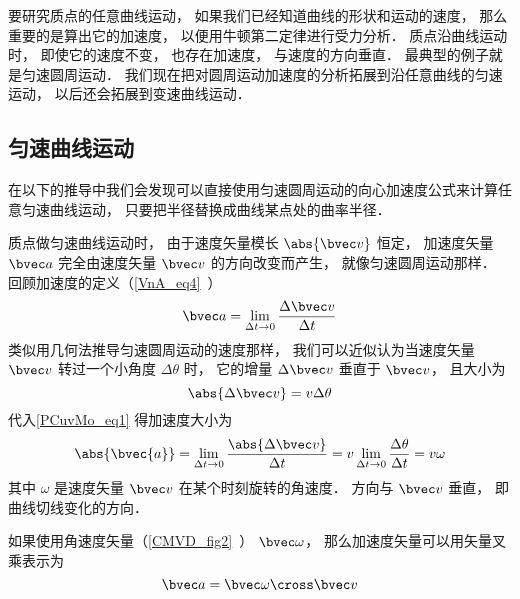 

要研究质点的任意曲线运动， 如果我们已经知道曲线的形状和运动的速度， 那么重要的是算出它的加速度， 以便用牛顿第二定律进行受力分析． 质点沿曲线运动时， 即使它的速度不变， 也存在加速度， 与速度的方向垂直． 最典型的例子就是匀速圆周运动． 我们现在把对圆周运动加速度的分析拓展到沿任意曲线的匀速运动， 以后还会拓展到变速曲线运动．

\subsection{匀速曲线运动}
在以下的推导中我们会发现可以直接使用匀速圆周运动的向心加速度公式来计算任意匀速曲线运动， 只要把半径替换成曲线某点处的曲率半径．

质点做匀速曲线运动时， 由于速度矢量模长 $\abs{\bvec v}$ 恒定， 加速度矢量 $\bvec a$ 完全由速度矢量 $\bvec v$ 的方向改变而产生， 就像匀速圆周运动那样． 回顾加速度的定义（\autoref{VnA_eq4}~）
\begin{equation}\label{PCuvMo_eq2}
\bvec a = \lim_{\Delta t \to 0} \frac{\Delta \bvec v}{\Delta t}
\end{equation}
类似用几何法推导匀速圆周运动的速度那样， 我们可以近似认为当速度矢量 $\bvec v$ 转过一个小角度 $\Delta \theta$ 时， 它的增量 $\Delta \bvec v$ 垂直于 $\bvec v$， 且大小为
\begin{equation}\label{PCuvMo_eq1}
\abs{\Delta \bvec v} = v\Delta\theta
\end{equation}
代入\autoref{PCuvMo_eq1} 得加速度大小为
\begin{equation}\label{PCuvMo_eq4}
\abs{\bvec{a}} = \lim_{\Delta t \to 0} \frac{\abs{\Delta \bvec v}}{\Delta t}
= v\lim_{\Delta t \to 0}\frac{\Delta \theta}{\Delta t} = v\omega
\end{equation}
其中 $\omega$ 是速度矢量 $\bvec v$ 在某个时刻旋转的角速度． 方向与 $\bvec v$ 垂直， 即曲线切线变化的方向．

如果使用角速度矢量（\autoref{CMVD_fig2}~） $\bvec \omega$， 那么加速度矢量可以用矢量叉乘表示为
\begin{equation}
\bvec a = \bvec \omega \cross \bvec v
\end{equation}

